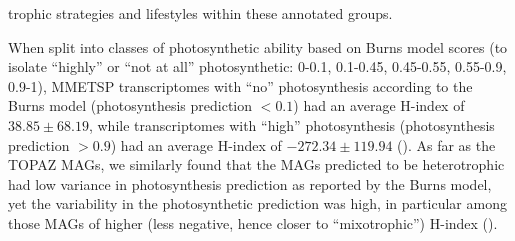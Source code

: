 \documentclass[12pt]{article}
\numberwithin{equation}{section}
\begin{document}
trophic strategies and lifestyles within these annotated groups. 

When split into classes of photosynthetic ability based on Burns model scores (to isolate ``highly'' or ``not at all'' photosynthetic: 0-0.1, 0.1-0.45, 0.45-0.55, 0.55-0.9, 0.9-1), MMETSP transcriptomes with ``no'' photosynthesis according to the Burns model (photosynthesis prediction $<0.1$) had an average H-index of $38.85\pm68.19$, while transcriptomes with ``high'' photosynthesis (photosynthesis prediction $>0.9$) had an average H-index of $-272.34\pm119.94$ (). As far as the TOPAZ MAGs, we similarly found that the MAGs predicted to be heterotrophic had low variance in photosynthesis prediction as reported by the Burns model, yet the variability in the photosynthetic prediction was high, in particular among those MAGs of higher (less negative, hence closer to ``mixotrophic'') H-index (). 
\end{document}

